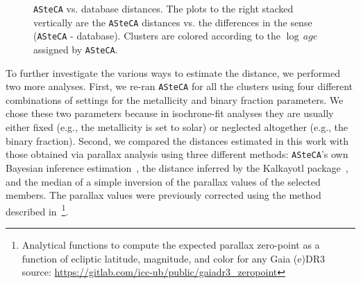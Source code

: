 \documentclass{aa}
\begin{document}
  \begin{figure}
   \caption{\texttt{ASteCA} vs. database distances. The plots to the right
   stacked vertically are the \texttt{ASteCA} distances vs. the differences
   in the sense (\texttt{ASteCA} - database). Clusters are colored according to
   the $\log\,age$ assigned by \texttt{ASteCA}.}
   \label{fig:distances}
  \end{figure}

  To further investigate the various ways to estimate the distance, we performed
  two more analyses. First, we re-ran \texttt{ASteCA} for all the
  clusters using four different combinations of settings for the metallicity and
  binary fraction parameters. We chose these two parameters because in
  isochrone-fit analyses they are usually either fixed (e.g., the metallicity is
  set to solar) or neglected altogether (e.g., the binary fraction).
  Second, we compared the distances estimated in this work with those obtained
  via parallax analysis using three different methods: \texttt{ASteCA}'s own
  Bayesian inference estimation~\citep[described in][]{Perren_2020}, the
  distance inferred by the Kalkayotl package~\citep{Kalkayotl}, and the median
  of a simple inversion of the parallax values of the selected members.
  The parallax values were previously corrected using the method described
  in~\cite{Lindegren_2021}\footnote{ Analytical functions to compute the
  expected parallax zero-point as a function of ecliptic latitude, magnitude, and
  color for any Gaia (e)DR3
  source: \url{https://gitlab.com/icc-ub/public/gaiadr3_zeropoint}}.
\end{document}
